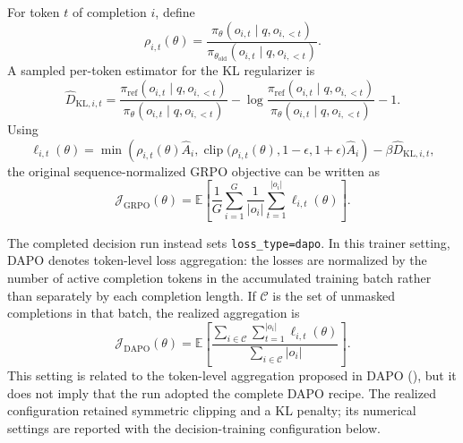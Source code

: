 For token $t$ of completion $i$, define
\begin{equation*}
    \rho_{i,t}(\theta)
    =
    \frac{\pi_\theta(o_{i,t}\mid q,o_{i,<t})}
         {\pi_{\theta_{\mathrm{old}}}(o_{i,t}\mid q,o_{i,<t})}.
\end{equation*}
A sampled per-token estimator for the KL regularizer is
\begin{equation*}
    \widehat{D}_{\mathrm{KL},i,t}
    =
    \frac{\pi_{\mathrm{ref}}(o_{i,t}\mid q,o_{i,<t})}
         {\pi_\theta(o_{i,t}\mid q,o_{i,<t})}
    -\log
    \frac{\pi_{\mathrm{ref}}(o_{i,t}\mid q,o_{i,<t})}
         {\pi_\theta(o_{i,t}\mid q,o_{i,<t})}
    -1.
\end{equation*}
Using
\begin{equation*}
    \ell_{i,t}(\theta)
    =
    \min\!\left(
        \rho_{i,t}(\theta)\widehat{A}_i,
        \operatorname{clip}
        \bigl(\rho_{i,t}(\theta),1-\epsilon,1+\epsilon\bigr)
        \widehat{A}_i
    \right)
    -\beta\widehat{D}_{\mathrm{KL},i,t},
\end{equation*}
the original sequence-normalized GRPO objective can be written as
\begin{equation}
    \mathcal{J}_{\mathrm{GRPO}}(\theta)
    =
    \mathbb{E}\!\left[
        \frac{1}{G}\sum_{i=1}^{G}
        \frac{1}{|o_i|}\sum_{t=1}^{|o_i|}
        \ell_{i,t}(\theta)
    \right].
\end{equation}

The completed decision run instead sets \texttt{loss\_type=dapo}. In this
trainer setting, DAPO denotes token-level loss aggregation: the losses are
normalized by the number of active completion tokens in the accumulated
training batch rather than separately by each completion length. If
$\mathcal{C}$ is the set of unmasked completions in that batch, the realized
aggregation is
\begin{equation}
    \mathcal{J}_{\mathrm{DAPO}}(\theta)
    =
    \mathbb{E}\!\left[
        \frac{\displaystyle
            \sum_{i\in\mathcal{C}}\sum_{t=1}^{|o_i|}\ell_{i,t}(\theta)}
             {\displaystyle
            \sum_{i\in\mathcal{C}}|o_i|}
    \right].
\end{equation}
This setting is related to the token-level aggregation proposed in DAPO
(\cite{yu2025dapo}), but it does not imply that the run adopted the complete
DAPO recipe. The realized configuration retained symmetric clipping and a KL
penalty; its numerical settings are reported with the decision-training
configuration below.






